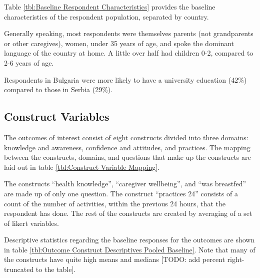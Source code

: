 \documentclass{article}
\begin{document}
Table \ref{tbl:Baseline Respondent Characteristics} provides the baseline characteristics of the respondent population, separated by country.

Generally speaking, most respondents were themselves parents (not grandparents or other caregives), women, under 35 years of age, and spoke the dominant language of the country at home. A little over half had children 0-2, compared to 2-6 years of age.

Respondents in Bulgaria were more likely to have a university education (42\%) compared to those in Serbia (29\%).



\subsection*{Construct Variables}

The outcomes of interest consist of eight constructs divided into three domains: knowledge and awareness, confidence and attitudes, and practices. The mapping between the constructs, domains, and questions that make up the constructs are laid out in table \ref{tbl:Construct Variable Mapping}.

The constructs ``health knowledge'', ``caregiver wellbeing'', and ``was breastfed'' are made up of only one question. The construct ``practices 24'' consists of a count of the number of activities, within the previous 24 hours, that the respondent has done. The rest of the constructs are created by averaging of a set of likert variables.

Descriptive statistics regarding the baseline responses for the outcomes are shown in table \ref{tbl:Outcome Construct Descriptives Pooled Baseline}. Note that many of the constructs have quite high means and medians [TODO: add percent right-truncated to the table].



\end{document}
